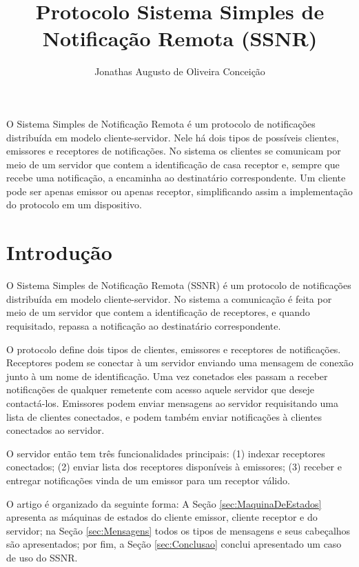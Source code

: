 \documentclass[12pt]{article}
\title{Protocolo Sistema Simples de Notificação Remota (SSNR)}
\author{
	Jonathas Augusto de Oliveira Conceição\inst{1}
}
\begin{document}
\maketitle

\begin{resumo}
	O Sistema Simples de Notificação Remota é um protocolo de notificações distribuída em modelo cliente-servidor.
	Nele há dois tipos de possíveis clientes, emissores e receptores de notificações.
	No sistema os clientes se comunicam por meio de um servidor que contem a identificação de casa receptor e,
	sempre que recebe uma notificação,
	a encaminha ao destinatário correspondente.
	Um cliente pode ser apenas emissor ou apenas receptor, simplificando assim a implementação do protocolo em um dispositivo.
\end{resumo}

\section{Introdução}

O Sistema Simples de Notificação Remota (SSNR)
é um protocolo de notificações distribuída em modelo cliente-servidor.
No sistema a comunicação é feita por meio de um servidor que contem a identificação de receptores,
e quando requisitado, repassa a notificação ao destinatário correspondente.

O protocolo define dois tipos de clientes, emissores e receptores de notificações.
Receptores podem se conectar à um servidor enviando uma mensagem de conexão junto à um nome de identificação.
Uma vez conetados eles passam a receber notificações de qualquer remetente com acesso aquele servidor que deseje contactá-los.
Emissores podem enviar mensagens ao servidor requisitando uma lista de clientes conectados,
e podem também enviar notificações à clientes conectados ao servidor.

O servidor então tem três funcionalidades principais:
(1) indexar receptores conectados;
(2) enviar lista dos receptores disponíveis à emissores;
(3) receber e entregar notificações vinda de um emissor para um receptor válido.

O artigo é organizado da seguinte forma:
A Seção \ref{sec:MaquinaDeEstados} apresenta as máquinas de estados do cliente emissor, cliente receptor e do servidor;
na Seção \ref{sec:Mensagens} todos os tipos de mensagens e seus cabeçalhos são apresentados;
por fim, a Seção \ref{sec:Conclusao} conclui apresentado um caso de uso do SSNR.
\end{document}
